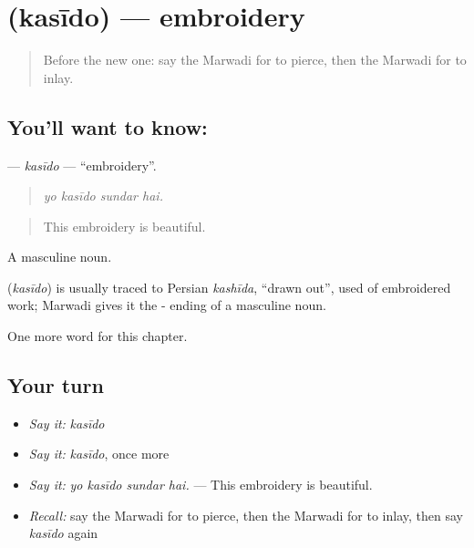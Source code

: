 \section[\texorpdfstring{\mw{कसीदो} (kasīdo)}{कसीदो (kasīdo)}]{ (kasīdo) — embroidery}

\label{lesson:MW-C283-kasido}



\begin{quote}
Before the new one: say the Marwadi for to pierce, then the Marwadi for to inlay.
\end{quote}

\subsection*{You'll want to know: }
\textbf{} — \emph{kasīdo} — \textquotedblleft{}embroidery\textquotedblright{}.

\begin{quote}
   
\end{quote}

\begin{quote}
\emph{yo kasīdo sundar hai.}
\end{quote}

\begin{quote}
This embroidery is beautiful.
\end{quote}

A masculine noun.

\begin{cousinweb}
\textbf{} (\emph{kasīdo}) is usually traced to Persian \emph{kashīda}, \textquotedblleft{}drawn out\textquotedblright{}, used of embroidered work; Marwadi gives it the - ending of a masculine noun.
\end{cousinweb}

\begin{grammarlens}[title={What you've built}]
One more word for this chapter.
\end{grammarlens}

\subsection*{Your turn}
\begin{itemize}
\raggedright
  \item \emph{Say it:} \emph{kasīdo}
  \item \emph{Say it:} \emph{kasīdo}, once more
  \item \emph{Say it:} \emph{yo kasīdo sundar hai.} — This embroidery is beautiful.
  \item \emph{Recall:} say the Marwadi for to pierce, then the Marwadi for to inlay, then say \emph{kasīdo} again
\end{itemize}

